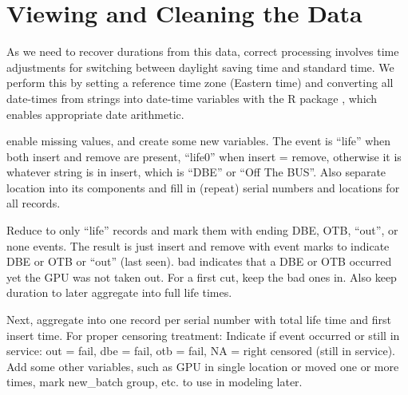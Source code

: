 \section{Viewing and Cleaning the Data}
\label{section:dataclean}


As we need to recover durations from this data, correct processing
involves time adjustments for switching between daylight saving time
and standard time. We perform this by setting a reference time zone
(Eastern time) and converting all date-times from strings into
date-time variables  with the R
 package \cite{lubridate}, which enables appropriate
date arithmetic.

 enable missing values, and create some new
variables. The event is “life” when both insert and remove are
present, “life0” when insert = remove, otherwise it is whatever string
is in insert, which is “DBE” or “Off The BUS”. Also separate location
into its components and fill in (repeat) serial numbers and locations
for all records.

Reduce to only “life” records and mark them with ending DBE, OTB,
“out”, or none events. The result is just insert and remove with event
marks to indicate DBE or OTB or “out” (last seen). bad indicates that
a DBE or OTB occurred yet the GPU was not taken out. For a first cut,
keep the bad ones in. Also keep duration to later aggregate into full
life times.

Next, aggregate into one record per serial number with total life time
and first insert time. For proper censoring treatment: Indicate if
event occurred or still in service: out = fail, dbe = fail, otb =
fail, NA = right censored (still in service). Add some other
variables, such as GPU in single location or moved one or more times,
mark new\_batch group, etc. to use in modeling later.

